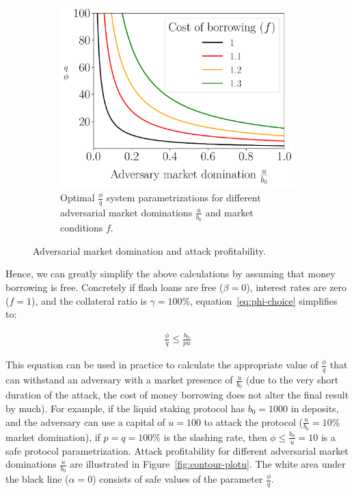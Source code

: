 \begin{figure}[htb]
\begin{subfigure}{0.49\textwidth}
    \includegraphics[width=\textwidth]{./plots/multiplef_plotu.pdf}
    \caption{Optimal $\frac{\phi}{q}$ system parametrizations
             for different adversarial market dominations $\frac{u}{b_0}$
             and market conditions $f$.}
    \label{fig:compare-f-plotu}
  \end{subfigure}
  \caption{Adversarial market domination and attack profitability.}
  \label{fig:plotu}
\end{figure}

Hence, we can greatly simplify the above calculations by assuming that money borrowing is free.
Concretely if flash loans are free ($\beta = 0$), interest rates are zero ($f = 1$),
and the collateral ratio is $\gamma = 100\%$, equation~\eqref{eq:phi-choice} simplifies to:

\begin{gather*}
  \frac{\phi}{q} \leq \frac{b_0}{pu} \label{eq:phi-choice-simple} \tag{$\ast$}
\end{gather*}

This equation can be used in practice to calculate the appropriate value
of $\frac{\phi}{q}$ that can withstand an adversary with a market presence of $\frac{u}{b_0}$
(due to the very short duration of the attack, the cost of money borrowing does not alter
the final result by much).
For example, if the liquid staking protocol has $b_0 = 1000$ \asset in deposits,
and the adversary can use a capital of $u = 100$ \asset to attack the protocol
($\frac{u}{b_0} = 10\%$ market domination),
if $p = q = 100\%$ is the slashing rate, then $\phi \leq \frac{b_0}{u} = 10$
is a safe protocol parametrization. Attack profitability for different adversarial
market dominations $\frac{u}{b_0}$ are illustrated in Figure~\ref{fig:contour-plotu}.
The white area under the black line ($\alpha = 0$) consists of safe values
of the parameter $\frac{\phi}{q}$.

